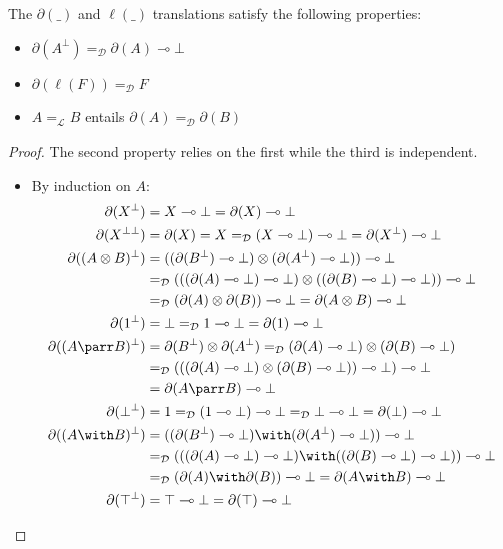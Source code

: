 \documentclass{lmcs}
\newcommand*{\orth}{^\perp} %
\newcommand*{\biorth}{^{\perp\perp}} %
\newcommand*{\tens}{\otimes} %
\newcommand*{\lolipop}{\multimap} %
\newcommand*{\Eu}{\mathcal{L}} %
\newcommand*{\eqeq}{=} %
\newcommand*{\eqEu}[1][]{\eqeq_{\Eu_{#1}}} %
\newcommand*{\isom}{\eqEu} %
\newcommand*{\thD}{\mathcal{D}}
\newcommand*{\isoc}{\eqeq_\thD} %
\newcommand*{\tradm}[1]{\ell(#1)}
\newcommand*{\tradc}[1]{\partial(#1)}
\begin{document}
\begin{lem}
\label{lem:trad_isos}
The $\tradc{\_}$ and $\tradm{\_}$ translations satisfy the following properties:
\begin{itemize}
\item $\tradc{A\orth}\isoc \tradc{A}\lolipop\bot$
\item $\tradc{\tradm{F}}\isoc F$
\item $A\isom B$ entails $\tradc{A}\isoc\tradc{B}$
\end{itemize}
\end{lem}
\begin{proof}
The second property relies on the first while the third is independent.
\begin{itemize}
\item By induction on $A$:
{\allowdisplaybreaks
\begin{align*}
\tradc{X\orth}&= X\lolipop\bot = \tradc{X}\lolipop\bot \\
\tradc{X\biorth}&= \tradc{X} = X \isoc (X \lolipop \bot)\lolipop\bot = \tradc{X\orth}\lolipop\bot \\
\tradc{(A\tens B)\orth} &= ((\tradc{B\orth}\lolipop\bot)\tens(\tradc{A\orth}\lolipop\bot))\lolipop\bot\\
  &\isoc (((\tradc{A}\lolipop\bot)\lolipop\bot)\tens((\tradc{B}\lolipop\bot)\lolipop\bot))\lolipop\bot\\
  &\isoc (\tradc{A}\tens\tradc{B})\lolipop\bot = \tradc{A\tens B}\lolipop\bot \\
\tradc{1\orth} &= \bot \isoc 1\lolipop\bot = \tradc{1}\lolipop\bot \\
\tradc{(A\parr B)\orth} &= \tradc{B\orth}\tens\tradc{A\orth} \isoc (\tradc{A}\lolipop\bot)\tens(\tradc{B}\lolipop\bot) \\
  &\isoc (((\tradc{A}\lolipop\bot)\tens(\tradc{B}\lolipop\bot))\lolipop\bot)\lolipop\bot \\
  &= \tradc{A\parr B}\lolipop\bot \\
\tradc{\bot\orth} &= 1 \isoc (1\lolipop\bot)\lolipop\bot \isoc \bot\lolipop\bot = \tradc{\bot}\lolipop\bot \\
\tradc{(A\with B)\orth} &= ((\tradc{B\orth}\lolipop\bot)\with(\tradc{A\orth}\lolipop\bot))\lolipop\bot\\
  &\isoc (((\tradc{A}\lolipop\bot)\lolipop\bot)\with((\tradc{B}\lolipop\bot)\lolipop\bot))\lolipop\bot\\
  &\isoc (\tradc{A}\with\tradc{B})\lolipop\bot = \tradc{A\with B}\lolipop\bot \\
\tradc{\top\orth} &= \top\lolipop\bot = \tradc{\top}\lolipop\bot \\

\end{align*}}
\end{itemize}
\end{proof}
\end{document}
